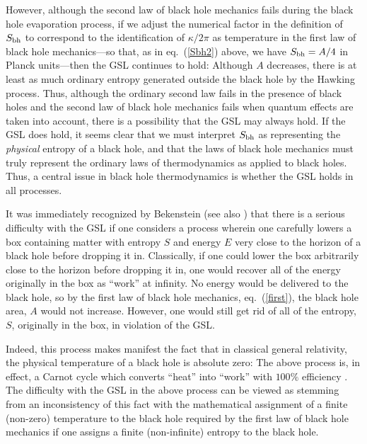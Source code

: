 \documentclass[12pt]{article}
\begin{document}
However, although the second law of black hole mechanics fails during
the black hole evaporation process, if we adjust the numerical factor
in the definition of $S_{\rm bh}$ to correspond to the identification
of $\kappa/2\pi$ as temperature in the first law of black hole
mechanics---so that, as in eq.~(\ref{Sbh2}) above, we have $S_{\rm bh}
= A/4$ in Planck units---then the GSL continues to hold: Although $A$
decreases, there is at least as much ordinary entropy generated
outside the black hole by the Hawking process. Thus, although the
ordinary second law fails in the presence of black holes and the
second law of black hole mechanics fails when quantum effects are
taken into account, there is a possibility that the GSL may always
hold. If the GSL does hold, it seems clear that we must interpret
$S_{\rm bh}$ as representing the {\it physical} entropy of a black
hole, and that the laws of black hole mechanics must truly represent
the ordinary laws of thermodynamics as applied to black holes. Thus, a
central issue in black hole thermodynamics is whether the GSL holds in
all processes.

It was immediately recognized by Bekenstein \cite{b1} (see also
\cite{bch}) that there is a serious difficulty with the GSL if one
considers a process wherein one carefully lowers a box containing
matter with entropy $S$ and energy $E$ very close to the horizon of a
black hole before dropping it in. Classically, if one could lower the
box arbitrarily close to the horizon before dropping it in, one would
recover all of the energy originally in the box as ``work'' at
infinity. No energy would be delivered to the black hole, so by the
first law of black hole mechanics, eq.~(\ref{first}), the black hole
area, $A$ would not increase. However, one would still get rid of all
of the entropy, $S$, originally in the box, in violation of the
GSL. 

Indeed, this process makes manifest the fact that in classical general
relativity, the physical temperature of a black hole is absolute zero:
The above process is, in effect, a Carnot cycle which converts
``heat'' into ``work'' with $100\%$ efficiency \cite{g}. The
difficulty with the GSL in the above process can be viewed as stemming
from an inconsistency of this fact with the mathematical assignment of
a finite (non-zero) temperature to the black hole required by the
first law of black hole mechanics if one assigns a finite
(non-infinite) entropy to the black hole.
\end{document}
